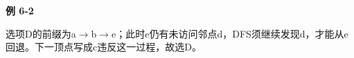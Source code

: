 {\color{ink}\bfseries 例 6-2}\par\vspace{1bp}选项D的前缀为a\(\to \)b\(\to \)e；此时e仍有未访问邻点d，DFS须继续发现d，才能从e回退。下一顶点写成c违反这一过程，故选D。
